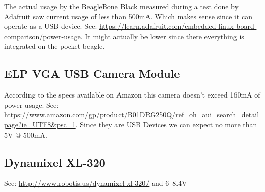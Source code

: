 \documentclass[]{book}
\begin{document}
The actual usage by the BeagleBone Black measured during a test done by Adafruit saw current usage of less than 500mA. Which makes sense since it can operate as a USB device. See: \url{https://learn.adafruit.com/embedded-linux-board-comparison/power-usage}. It might actually be lower since there everything is integrated on the pocket beagle.

\subsection{ELP VGA USB Camera Module}
According to the specs available on Amazon this camera doesn't exceed 160mA of power usage. See: \url{https://www.amazon.com/gp/product/B01DRG250Q/ref=oh_aui_search_detailpage?ie=UTF8&psc=1}. Since they are USB Devices we can expect no more than 5V @ 500mA. 

\subsection{Dynamixel XL-320}
See: \url{http://www.robotis.us/dynamixel-xl-320/} and
6~8.4V
\end{document}
